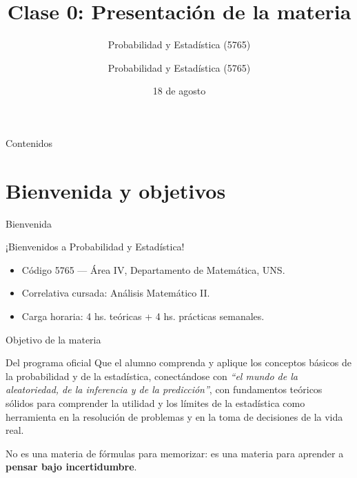 \documentclass[aspectratio=169,11pt]{beamer}
\title[Prob. y Estadística]{Clase 0: Presentación de la materia}
\subtitle{Probabilidad y Estadística (5765)}
\institute[UNS]{Universidad Nacional del Sur \\ Departamento de Matemática}
\author{Probabilidad y Estadística (5765)}
\date{18 de agosto}
\begin{document}
\begin{frame}
\titlepage
\end{frame}

\begin{frame}{Contenidos}
\tableofcontents
\end{frame}

\section{Bienvenida y objetivos}

\begin{frame}{Bienvenida}
\begin{center}
\Large ¡Bienvenidos a Probabilidad y Estadística!
\end{center}
\vspace{1em}
\begin{itemize}
\item Código 5765 — Área IV, Departamento de Matemática, UNS.
\item Correlativa cursada: Análisis Matemático II.
\item Carga horaria: 4 hs. teóricas + 4 hs. prácticas semanales.
\end{itemize}
\end{frame}

\begin{frame}{Objetivo de la materia}
\begin{block}{Del programa oficial}
Que el alumno comprenda y aplique los conceptos básicos de la probabilidad y de la estadística, conectándose con \emph{``el mundo de la aleatoriedad, de la inferencia y de la predicción''}, con fundamentos teóricos sólidos para comprender la utilidad y los límites de la estadística como herramienta en la resolución de problemas y en la toma de decisiones de la vida real.
\end{block}
\vspace{1em}
No es una materia de fórmulas para memorizar: es una materia para aprender a \textbf{pensar bajo incertidumbre}.
\end{frame}
\end{document}
